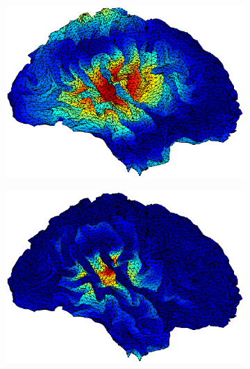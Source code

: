 \documentclass[doc,a4paper,12pt]{apa6}
\begin{document}
\begin{figure}
  \begin{subfigure}[c]{0.47\textwidth}
    \includegraphics[width=\textwidth]{ergebnisse/activity/pa07_eve2_sss_lcmv_activity_right.eps}
    \label{img:pa07:aktiv:sss-lcmv}
  \end{subfigure}\hspace*{0.04\textwidth}
  \begin{subfigure}[c]{0.47\textwidth}
    \includegraphics[width=\textwidth]{ergebnisse/activity/pa07_eve2_sss_mne_activity_right.eps}
    \label{img:pa07:aktiv:sss-mne}
  \end{subfigure}\vspace*{0.04\textwidth}
  \begin{subfigure}[c]{0.47\textwidth}

\end{subfigure}
\end{figure}
\end{document}
